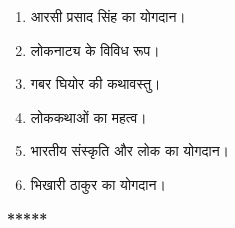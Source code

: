 \documentclass[11pt,a4paper]{article}
\begin{document}
\begin{enumerate}[label=(\roman*)]
  \item आरसी प्रसाद सिंह का योगदान।
  \item लोकनाट्य के विविध रूप।
  \item गबर घियोर की कथावस्तु।
  \item लोककथाओं का महत्व।
  \item भारतीय संस्कृति और लोक का योगदान।
  \item भिखारी ठाकुर का योगदान।
\end{enumerate}

\bigskip
\begin{center}
  \textbf{*****}
\end{center}
\end{document}
